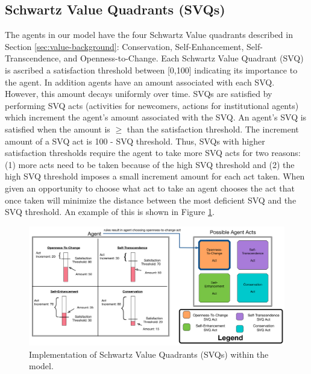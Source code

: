 \documentclass{scspaperproc}
\theoremstyle{scsthe}
\begin{document}
\subsection{Schwartz Value Quadrants (SVQs)} 
The agents in our model have the four Schwartz Value quadrants described in Section \ref{sec:value-background}: Conservation, Self-Enhancement, Self-Transcendence, and Openness-to-Change. Each Schwartz Value Quadrant (SVQ) is ascribed a satisfaction threshold between [0,100] indicating its importance to the agent. In addition agents have an amount associated with each SVQ. However, this amount decays uniformly over time. SVQs are satisfied by performing SVQ acts (activities for newcomers, actions for institutional agents) which increment the agent's amount associated with the SVQ. An agent's SVQ is satisfied when the amount is $\geq$ than the satisfaction threshold. The increment amount of a SVQ act is 100 - SVQ threshold. Thus, SVQs with higher satisfaction thresholds require the agent to take more SVQ acts for two reasons: (1) more acts need to be taken because of the high SVQ threshold and (2) the high SVQ threshold imposes a small increment amount for each act taken. When given an opportunity to choose what act to take an agent chooses the act that once taken will minimize the distance between the most deficient SVQ and the SVQ threshold. An example of this is shown in Figure \ref{fig:agent-val}.

\begin{figure}[htb]
{
\centering
\includegraphics[width=0.75\columnwidth]{Agent-Value-In-Model.png}
\caption{Implementation of Schwartz Value Quadrants (SVQs) within the model.}
\label{fig:agent-val}
}
\end{figure}
\end{document}
